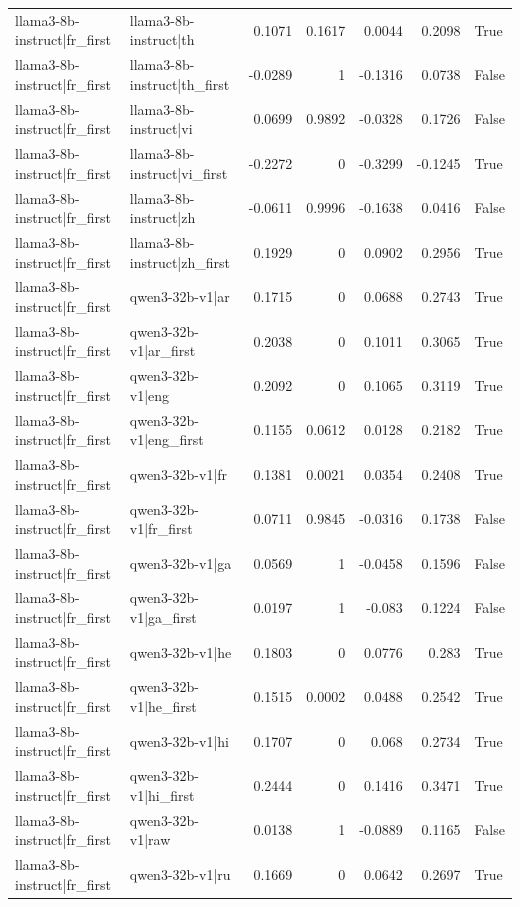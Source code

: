 \begin{table}
\begin{tabular}{l l r r r r l}
llama3-8b-instruct|fr_first & llama3-8b-instruct|th & 0.1071 & 0.1617 & 0.0044 & 0.2098 & True \\
llama3-8b-instruct|fr_first & llama3-8b-instruct|th_first & -0.0289 & 1 & -0.1316 & 0.0738 & False \\
llama3-8b-instruct|fr_first & llama3-8b-instruct|vi & 0.0699 & 0.9892 & -0.0328 & 0.1726 & False \\
llama3-8b-instruct|fr_first & llama3-8b-instruct|vi_first & -0.2272 & 0 & -0.3299 & -0.1245 & True \\
llama3-8b-instruct|fr_first & llama3-8b-instruct|zh & -0.0611 & 0.9996 & -0.1638 & 0.0416 & False \\
llama3-8b-instruct|fr_first & llama3-8b-instruct|zh_first & 0.1929 & 0 & 0.0902 & 0.2956 & True \\
llama3-8b-instruct|fr_first & qwen3-32b-v1|ar & 0.1715 & 0 & 0.0688 & 0.2743 & True \\
llama3-8b-instruct|fr_first & qwen3-32b-v1|ar_first & 0.2038 & 0 & 0.1011 & 0.3065 & True \\
llama3-8b-instruct|fr_first & qwen3-32b-v1|eng & 0.2092 & 0 & 0.1065 & 0.3119 & True \\
llama3-8b-instruct|fr_first & qwen3-32b-v1|eng_first & 0.1155 & 0.0612 & 0.0128 & 0.2182 & True \\
llama3-8b-instruct|fr_first & qwen3-32b-v1|fr & 0.1381 & 0.0021 & 0.0354 & 0.2408 & True \\
llama3-8b-instruct|fr_first & qwen3-32b-v1|fr_first & 0.0711 & 0.9845 & -0.0316 & 0.1738 & False \\
llama3-8b-instruct|fr_first & qwen3-32b-v1|ga & 0.0569 & 1 & -0.0458 & 0.1596 & False \\
llama3-8b-instruct|fr_first & qwen3-32b-v1|ga_first & 0.0197 & 1 & -0.083 & 0.1224 & False \\
llama3-8b-instruct|fr_first & qwen3-32b-v1|he & 0.1803 & 0 & 0.0776 & 0.283 & True \\
llama3-8b-instruct|fr_first & qwen3-32b-v1|he_first & 0.1515 & 0.0002 & 0.0488 & 0.2542 & True \\
llama3-8b-instruct|fr_first & qwen3-32b-v1|hi & 0.1707 & 0 & 0.068 & 0.2734 & True \\
llama3-8b-instruct|fr_first & qwen3-32b-v1|hi_first & 0.2444 & 0 & 0.1416 & 0.3471 & True \\
llama3-8b-instruct|fr_first & qwen3-32b-v1|raw & 0.0138 & 1 & -0.0889 & 0.1165 & False \\
llama3-8b-instruct|fr_first & qwen3-32b-v1|ru & 0.1669 & 0 & 0.0642 & 0.2697 & True \\

\end{tabular}
\end{table}
